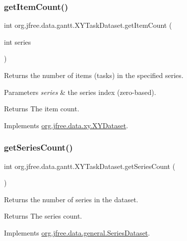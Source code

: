 \subsubsection{\texorpdfstring{get\+Item\+Count()}{getItemCount()}}
{\footnotesize\ttfamily int org.\+jfree.\+data.\+gantt.\+X\+Y\+Task\+Dataset.\+get\+Item\+Count (\begin{DoxyParamCaption}\item[{int}]{series }\end{DoxyParamCaption})}

Returns the number of items (tasks) in the specified series.


\begin{DoxyParams}{Parameters}
{\em series} & the series index (zero-\/based).\\
\hline
\end{DoxyParams}
\begin{DoxyReturn}{Returns}
The item count. 
\end{DoxyReturn}


Implements \mbox{\hyperlink{interfaceorg_1_1jfree_1_1data_1_1xy_1_1_x_y_dataset_ae81f9de91dfcae45028fc8a486a119da}{org.\+jfree.\+data.\+xy.\+X\+Y\+Dataset}}.

\mbox{\label{classorg_1_1jfree_1_1data_1_1gantt_1_1_x_y_task_dataset_aa9b2839f31bc3fb79c2b9ebf7154cfc8}} 
\subsubsection{\texorpdfstring{get\+Series\+Count()}{getSeriesCount()}}
{\footnotesize\ttfamily int org.\+jfree.\+data.\+gantt.\+X\+Y\+Task\+Dataset.\+get\+Series\+Count (\begin{DoxyParamCaption}{ }\end{DoxyParamCaption})}

Returns the number of series in the dataset.

\begin{DoxyReturn}{Returns}
The series count. 
\end{DoxyReturn}


Implements \mbox{\hyperlink{interfaceorg_1_1jfree_1_1data_1_1general_1_1_series_dataset_a84fe822f5918f941d9de1ed1b73c9f58}{org.\+jfree.\+data.\+general.\+Series\+Dataset}}.

